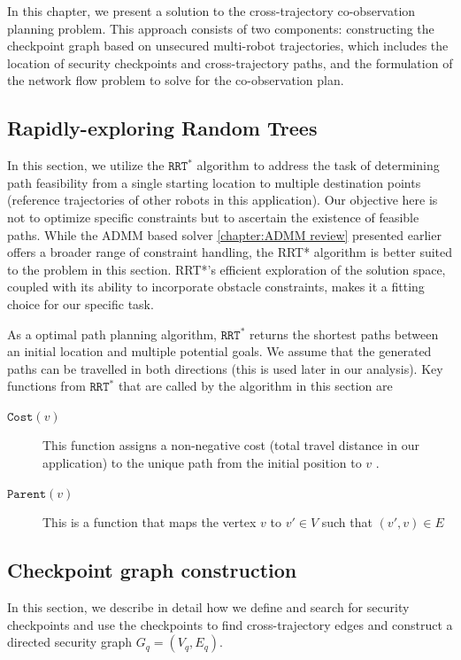 \documentclass[journal]{IEEEtran}  %
\newcommand{\rrtstar}{$\texttt{RRT}^\texttt{*}$}
\begin{document}
In this chapter, we present a solution to the cross-trajectory co-observation planning problem. This approach consists of two components: constructing the checkpoint graph based on unsecured multi-robot trajectories, which includes the location of security checkpoints and cross-trajectory paths, and the formulation of the network flow problem to solve for the co-observation plan.

\subsection{Rapidly-exploring Random Trees}
In this section, we utilize the \rrtstar{} \cite{karaman2010incremental} algorithm to address the task of determining path feasibility from a single starting location to multiple destination points (reference trajectories of other robots in this application). Our objective here is not to optimize specific constraints but to ascertain the existence of feasible paths. While the ADMM based solver \ref{chapter:ADMM review} presented earlier offers a broader range of constraint handling, the RRT* algorithm is better suited to the problem in this section. RRT*'s efficient exploration of the solution space, coupled with its ability to incorporate obstacle constraints, makes it a fitting choice for our specific task.

As a optimal path planning algorithm, \rrtstar{} returns the shortest paths between an initial location and multiple potential goals. We assume that the generated paths can be travelled in both directions (this is used later in our analysis). 
Key functions from \rrtstar{} that are called by the algorithm in this section are
\begin{description}
\item[$\texttt{Cost}(v)$] This function assigns a non-negative cost (total travel distance in our application) to the unique path from the initial position to $v$ . 
\item[$\texttt{Parent}(v)$] This is a function that maps the vertex $v$ to $v'\in V$ such that $(v',v)\in E$
\end{description}

\subsection{Checkpoint graph construction}

In this section, we describe in detail how we define and search for security checkpoints and use the checkpoints to find cross-trajectory edges and construct a directed security graph $G_{q}=(V_{q},E_{q})$.
\end{document}
